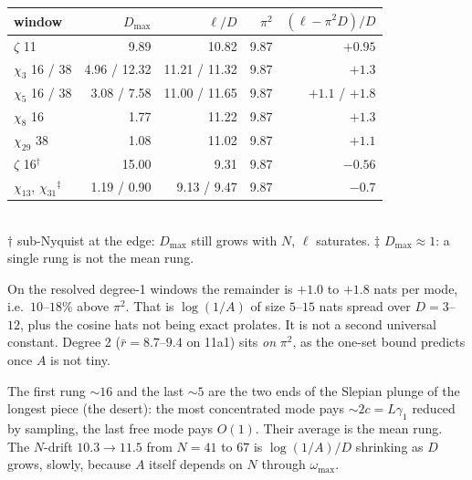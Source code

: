 \documentclass[11pt]{article}
\theoremstyle{remark}\newtheorem*{remark}{Remark}
\begin{document}
\begin{center}\small
\begin{tabular}{lrrrr}\toprule
window & $D_{\max}$ & $\ell/D$ & $\pi^2$ & $(\ell-\pi^2 D)/D$\\
\midrule
$\zeta$ 11 & 9.89 & 10.82 & 9.87 & $+0.95$\\
$\chi_3$ 16 / 38 & 4.96 / 12.32 & 11.21 / 11.32 & 9.87 & $+1.3$\\
$\chi_5$ 16 / 38 & 3.08 / 7.58 & 11.00 / 11.65 & 9.87 & $+1.1$ / $+1.8$\\
$\chi_8$ 16 & 1.77 & 11.22 & 9.87 & $+1.3$\\
$\chi_{29}$ 38 & 1.08 & 11.02 & 9.87 & $+1.1$\\
$\zeta$ 16$^\dagger$ & 15.00 & 9.31 & 9.87 & $-0.56$\\
$\chi_{13}$, $\chi_{31}$$^\ddagger$ & 1.19 / 0.90 & 9.13 / 9.47 & 9.87 & $-0.7$\\
\bottomrule
\end{tabular}\\[2pt]
{\footnotesize $\dagger$ sub-Nyquist at the edge: $D_{\max}$ still grows with $N$, $\ell$ saturates.
$\ddagger$ $D_{\max}\approx 1$: a single rung is not the mean rung.}
\end{center}

On the resolved degree-1 windows the remainder is $+1.0$ to $+1.8$ nats
per mode, i.e.\ $10$--$18\%$ above $\pi^2$. That is $\log(1/A)$ of size
$5$--$15$ nats spread over $D=3$--$12$, plus the cosine hats not being
exact prolates. It is not a second universal constant. Degree 2
($\bar r=8.7$--$9.4$ on 11a1) sits \emph{on} $\pi^2$, as the one-set
bound predicts once $A$ is not tiny.

The first rung $\sim 16$ and the last $\sim 5$ are the two ends of the
Slepian plunge of the longest piece (the desert): the most concentrated
mode pays $\sim 2c=L\gamma_1$ reduced by sampling, the last free mode
pays $O(1)$. Their average is the mean rung. The $N$-drift
$10.3\to 11.5$ from $N=41$ to $67$ is $\log(1/A)/D$ shrinking as $D$
grows, slowly, because $A$ itself depends on $N$ through $\omega_{\max}$.
\end{document}
